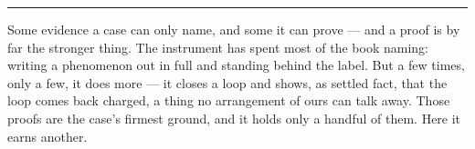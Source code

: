 %
%
%
%

\bigskip
\begin{center}
\rule{0.4\textwidth}{0.4pt}
\end{center}
\bigskip

\noindent Some evidence a case can only name, and some it can prove --- and a proof is by far the stronger
thing. The instrument has spent most of the book naming: writing a phenomenon out in full and standing behind
the label. But a few times, only a few, it does more --- it closes a loop and shows, as settled fact, that the
loop comes back charged, a thing no arrangement of ours can talk away. Those proofs are the case's firmest
ground, and it holds only a handful of them. Here it earns another.


